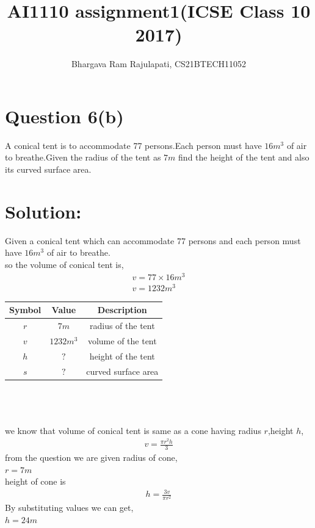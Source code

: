 \documentclass[article,12pt,twocolumn]{IEEEtran}
\title{AI1110 assignment1(ICSE Class 10 2017)}
\author{Bhargava Ram Rajulapati, CS21BTECH11052}
\begin{document}
  \maketitle
  \section*{Question 6(b)}
   A conical tent is to accommodate 77 persons.Each person must  
   have $16m^3$ of air to breathe.Given the radius of the tent as
   $7m$ find the height of the tent and also its curved surface
   area.\\
  \section*{Solution:}
  Given a conical tent which can accommodate 77 persons and each         
   person must have $16m^3$ of air to breathe.\\
  so the volume of conical tent is,
  \begin{align*}
    v = 77 \times 16 m^3 \\
    v = 1232 m^3  
  \end{align*}
   \begin{tabular}{|c|c|c|}
    \hline
     Symbol & Value & Description \\
    \hline \hline
     $r$ & $7m$ & radius of the tent\\
    \hline
     $v$ & $1232 m^3$ & volume of the tent \\
    \hline
     $h$ & $?$ & height of the tent  \\
    \hline
     $s$ & $?$ & curved surface area \\
    \hline
 \end{tabular} \\\\\\
  we know that volume of conical tent is same as a cone having
  radius $r$,height $h$,
  \begin{align*}
     v = \frac{\pi r^2 h}{3} 
  \end{align*}
  from the question we are given radius of cone, \\
  $ r = 7 m $\\ 
  height of cone is
  \begin{align*}
   h = \frac{3 v}{\pi r^2} 
  \end{align*}
  By substituting values we can get, \\
  $ h = 24 m $ \\\\
\end{document}
